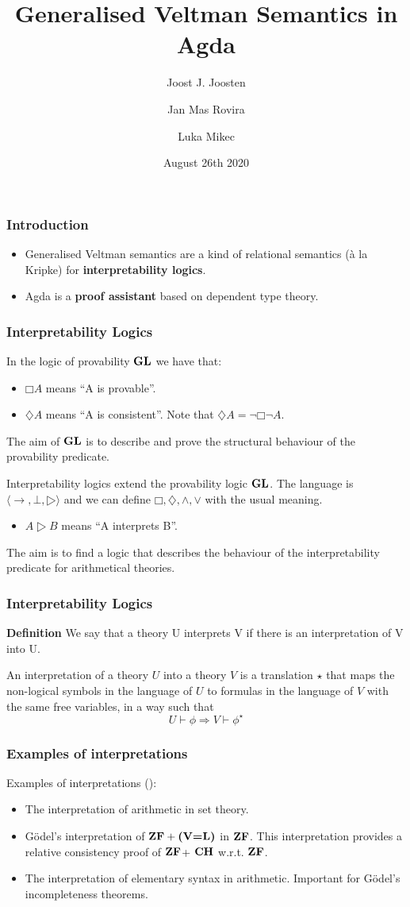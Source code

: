 \documentclass{beamer}
\title{Generalised Veltman Semantics in Agda}
\author{Joost J. Joosten\inst{1} \and Jan Mas Rovira\inst{1}\and Luka Mikec\inst{2}}
\institute[shortinst]{\inst{1} University of Barcelona \and %
  \inst{2} University of Zagreb}
\date{August 26th 2020}
\newcommand{\prin}[1]{\ensuremath{\textbf{\textup{#1}}}\xspace}
\newcommand{\gl}{\prin{GL}}
\newcommand{\zf}{\prin{ZF}}
\newcommand{\ch}{\prin{CH}}
\newcommand{\veql}{\prin{(V=L)}}
\begin{document}
\frame{\titlepage}

\begin{frame}
  \frametitle{Introduction}
  \begin{itemize}
  \item Generalised Veltman semantics are a kind of relational semantics (à la
    Kripke) for \textbf{interpretability logics}. \break \pause
    \item Agda is a \textbf{proof assistant} based on dependent type theory.
  \end{itemize}
\end{frame}

\begin{frame}
  \frametitle{Interpretability Logics}
  In the logic of provability \gl we have that:
  \begin{itemize}
    \item $□A$ means ``A is provable''.
    \item $♢A$ means ``A is consistent''. Note that $♢A=¬□¬A$.
  \end{itemize}
  The aim of \gl is to describe and prove the structural behaviour of the
  provability predicate.

  \pause \vspace{0.5cm}

  Interpretability logics extend the provability logic \gl. The language is
  $⟨→,⊥,▷⟩$ and we can define $□,♢,∧,∨$ with the usual meaning.
  \begin{itemize}
  \item $A▷B$ means ``A interprets B''.
  \end{itemize}
  The aim is to find a logic that describes the behaviour
  of the interpretability predicate for arithmetical theories.
\end{frame}

\begin{frame}
  \frametitle{Interpretability Logics}
  \textbf{Definition} We say that a theory U interprets V if there is an
  interpretation of V into U.

  An interpretation of a theory $U$ into a theory $V$ is a translation $⋆$ that
  maps the non-logical symbols in the language of $U$ to formulas in the
  language of $V$ with the same free variables, in a way such that
  \[U⊢ϕ⇒ V⊢ϕ^⋆\]
\end{frame}

\begin{frame}
  \frametitle{Examples of interpretations}
  Examples of interpretations (\cite{visser1997overview}):
  \vspace{0.4cm}
  \begin{itemize}
  \item The interpretation of arithmetic in set theory.
    \pause
  \item Gödel's interpretation of $\zf+\veql$ in \zf. This interpretation
    provides a relative consistency proof of \zf + \ch w.r.t. \zf.
    \pause
  \item The interpretation of elementary syntax in arithmetic. Important for
    Gödel's incompleteness theorems.
  \end{itemize}

\end{frame}
\end{document}
